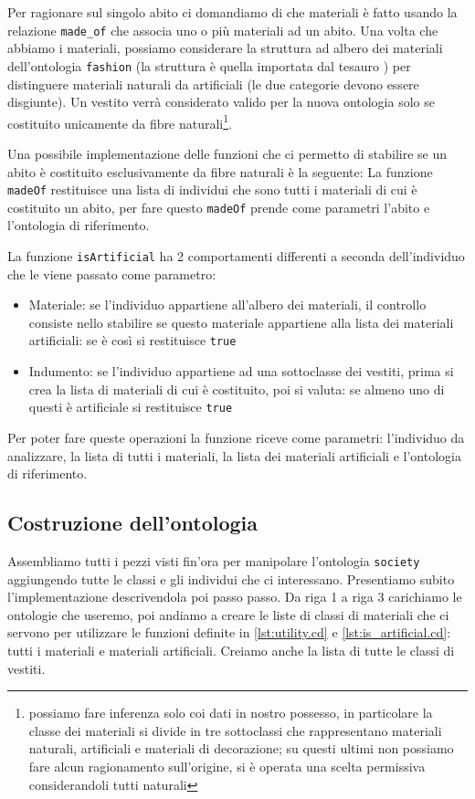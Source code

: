 Per ragionare sul singolo abito ci domandiamo di che materiali è fatto usando la relazione \verb|made_of| che associa uno o più materiali ad un abito. Una volta che abbiamo i materiali, possiamo considerare la struttura ad albero dei materiali dell'ontologia \verb|fashion| (la struttura è quella importata dal tesauro ) per distinguere materiali naturali da artificiali (le due categorie devono essere disgiunte). Un vestito verrà considerato valido per la nuova ontologia solo se costituito unicamente da fibre naturali\footnote{possiamo fare inferenza solo coi dati in nostro possesso, in particolare la classe dei materiali si divide in tre sottoclassi che rappresentano materiali naturali, artificiali e materiali di decorazione; su questi ultimi non possiamo fare alcun ragionamento sull'origine, si è operata una scelta permissiva considerandoli tutti naturali}.

Una possibile implementazione delle funzioni che ci permetto di stabilire se un abito è costituito esclusivamente da fibre naturali è la seguente:
La funzione \verb|madeOf| restituisce una lista di individui che sono tutti i materiali di cui è costituito un abito, per fare questo \verb|madeOf| prende come parametri l'abito e l'ontologia di riferimento. 

La funzione \verb|isArtificial| ha 2 comportamenti differenti a seconda dell'individuo che le viene passato come parametro:
\begin{itemize}
	\item Materiale: se l'individuo appartiene all'albero dei materiali, il controllo consiste nello stabilire se questo materiale appartiene alla lista dei materiali artificiali: se è così si restituisce \verb|true|
	\item Indumento: se l'individuo appartiene ad una sottoclasse dei vestiti, prima si crea la lista di materiali di cui è costituito, poi si valuta: se almeno uno di questi è artificiale si restituisce \verb|true|
\end{itemize}
Per poter fare queste operazioni la funzione riceve come parametri: l'individuo da analizzare, la lista di tutti i materiali, la lista dei materiali artificiali e  l'ontologia di riferimento.
\subsection{Costruzione dell'ontologia}
Assembliamo tutti i pezzi visti fin'ora per manipolare l'ontologia \verb|society| aggiungendo tutte le classi e gli individui che ci interessano. Presentiamo subito l'implementazione descrivendola poi passo passo.
Da riga 1 a riga 3 carichiamo le ontologie che useremo, poi andiamo a creare le liste di classi di materiali che ci servono per utilizzare le funzioni definite in \ref{lst:utility.cd} e \ref{lst:is_artificial.cd}: tutti i materiali e materiali artificiali. Creiamo anche la lista di tutte le classi di vestiti.

